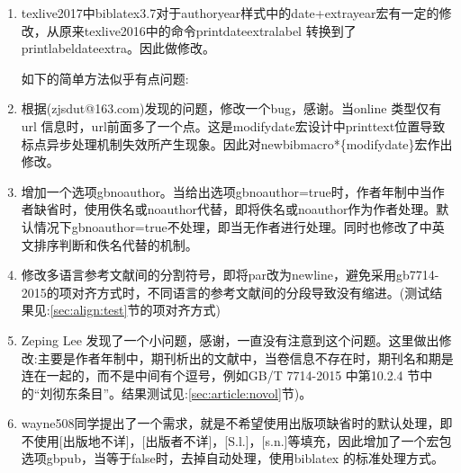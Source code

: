\label{up:170411}
\begin{enumerate}
\item texlive2017中biblatex3.7对于authoryear样式中的date+extrayear宏有一定的修改，从原来texlive2016中的命令printdateextralabel 转换到了printlabeldateextra。因此做修改。

    如下的简单方法似乎有点问题:
    \begin{texlist}
    \let\printdateextralabel=\printlabeldateextra
    \end{texlist}

\item 根据(zjsdut@163.com)发现的问题，修改一个bug，感谢。当online 类型仅有url 信息时，url前面多了一个点。这是modifydate宏设计中printtext位置导致标点异步处理机制失效所产生现象。因此对newbibmacro*\{modifydate\}宏作出修改。

\item 增加一个选项gbnoauthor。当给出选项gbnoauthor=true时，作者年制中当作者缺省时，使用佚名或noauthor代替，即将佚名或noauthor作为作者处理。默认情况下gbnoauthor=true不处理，即当无作者进行处理。同时也修改了中英文排序判断和佚名代替的机制。

\item 修改多语言参考文献间的分割符号，即将par改为newline，避免采用gb7714-2015的项对齐方式时，不同语言的参考文献间的分段导致没有缩进。(测试结果见:\ref{sec:align:test}节的项对齐方式)

    \begin{texlist}
    \renewcommand*{\entrysetpunct}{\adddot\newline\nobreak}
    \end{texlist}

\item Zeping Lee 发现了一个小问题，感谢，一直没有注意到这个问题。这里做出修改:主要是作者年制中，期刊析出的文献中，当卷信息不存在时，期刊名和期是连在一起的，而不是中间有个逗号，例如GB/T 7714-2015 中第10.2.4 节中的“刘彻东条目”。结果测试见:\ref{sec:article:novol}节)。

\item wayne508同学提出了一个需求，就是不希望使用出版项缺省时的默认处理，即不使用[出版地不详]，[出版者不详]，[S.l.]，[s.n.]等填充，因此增加了一个宏包选项gbpub，当等于false时，去掉自动处理，使用biblatex 的标准处理方式。

\end{enumerate}

